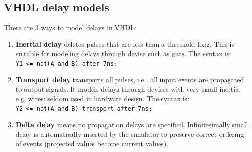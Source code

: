 \documentclass[a4paper,11pt]{article}
\begin{document}
\subsection{VHDL delay models}

\lstset{language=VHDL}

There are 3 ways to model delays in VHDL:
\begin{enumerate}
	\item \textbf{Inertial delay} deletes pulses that are less than a threshold long. This is suitable for modeling delays through devise such as gate. The syntax is: \\ \lstinline|Y1 <= not(A and B) after 7ns;|

	\item \textbf{Transport delay} transports all pulses, i.e., all input events are propagated to output signals. It models delays through devices with very small inertia, e.g, wires: seldom used in hardware design. The syntax is: \\ \lstinline|Y2 <= not(A and B) transport after 7ns;|

	\item \textbf{Delta delay} means no propagation delays are specified.
	      Infinitesimally small delay is automatically inserted by the
	      simulator to preserve correct ordering of events (projected
	      values become current values).
\end{enumerate}
\end{document}

